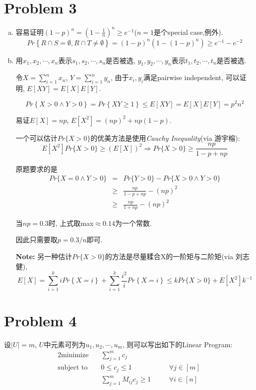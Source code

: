 \documentclass[paper=a4, fontsize=11pt]{scrartcl} %
\numberwithin{equation}{section} %
\numberwithin{figure}{section} %
\numberwithin{table}{section} %
\begin{document}
\section*{Problem 3}
\begin{enumerate}[(a)]
	\item
    容易证明$(1-p)^n = (1 - \frac{1}{n})^n \geq e^{-1}$($n=1$是个special case,例外).
    $$Pr\left\{R\cap S = \emptyset, R\cap T \not= \emptyset\right\} = (1-p)^n\left(1 - (1-p)^n\right) \geq e^{-1} - e^{-2}$$
    \item
    用$x_1, x_2, \cdots, x_n$表示$s_1, s_2, \cdots, s_n$是否被选, $y_1, y_2, \cdots, y_n$表示$t_1, t_2, \cdots, t_n$是否被选.
    
    令$X = \sum_{i=1}^{n}x_n$, $Y =\sum_{i=1}^{n}y_n$, 由于$x_i, y_i$满足pairwise independent, 可以证明, $E[XY] = E[X]E[Y]$.
    
    $$Pr\left\{X > 0 \wedge Y > 0\right\} =  Pr\left\{XY \geq 1\right\} \leq E[XY] = E[X]E[Y] = p^2n^2$$
   	
    易证$E[X]=np$, $E[X^2] = (np)^2 + np(1-p)$.
    
    一个可以估计$Pr\{X>0\}$的优美方法是使用\textit{Cauchy Inequality}(via 游宇榕):
    $$E[X^2]Pr\{X>0\} \geq (E[X])^2 \Longrightarrow Pr\{X>0\} \geq \frac{np}{1-p+np} $$
    
    原题要求的是
    \begin{eqnarray*}
    Pr\{X=0 \wedge Y > 0\} & = & Pr\{Y>0\} - Pr\{X > 0 \wedge Y > 0\} \\ 
    & \geq & \frac{np}{1-p+np} - (np)^2 \\
    & \geq & \frac{np}{1+np} - (np)^2
    \end{eqnarray*}
    
    当$np=0.3$时, 上式取max$\approx0.14$为一个常数.
    
    因此只需要取$p = 0.3/n$即可.
    
    \textbf{Note:} 另一种估计$Pr\{X>0\}$的方法是尽量糅合X的一阶矩与二阶矩(via 刘志健), $$E[X] = \sum_{i=1}^{k}i Pr\left\{X=i\right\} + \sum_{i=1}^{k}\frac{i^2}{i} Pr\left\{X=i\right\} \leq k Pr\{X > 0\} + E[X^2]k^{-1} $$
\end{enumerate}
\section*{Problem 4}
设$|U| = m$, $U$中元素可列为$u_1, u_2, \cdots, u_m$, 则可以写出如下的Linear Program:
   \begin{alignat*}{2}
\mbox{minimize} \quad & \sum_{j=1}^m{c_j} & {} & {}\\
\mbox{subject to} \quad
& 0\leq c_j \leq 1 & \quad & {\forall j \in [m]}\\
& \sum_{j=1}^{m} M_{ij}c_j \geq 1 & \quad& {\forall i \in [n]}
\end{alignat*}
\end{document}
